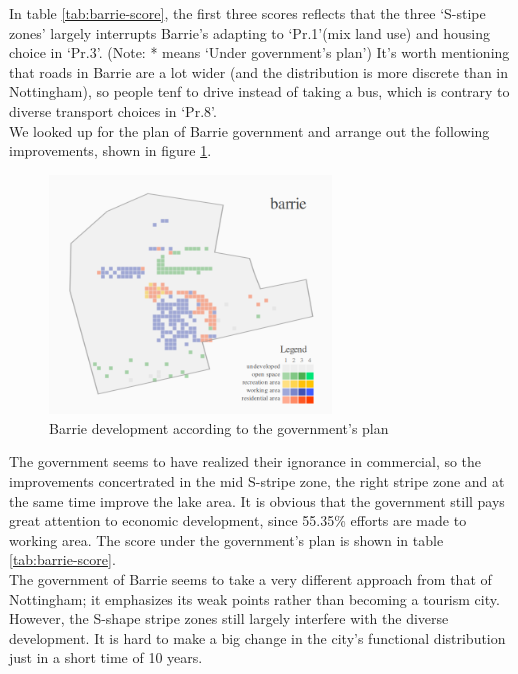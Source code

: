 In table \ref{tab:barrie-score}, the first three scores reflects that the three `S-stipe zones' largely interrupts Barrie's adapting to `Pr.1'(mix land use) and housing choice in `Pr.3'. (Note: * means `Under government's plan')
It's worth mentioning that roads in Barrie are a lot wider (and the distribution is more discrete than in Nottingham), so people tenf to drive instead of taking a bus, which is contrary to diverse transport choices in `Pr.8'.\\

We looked up for the plan of Barrie government \cite{pdf:barrie-downtown-plan} \cite{pdf:barrie-waterfront} \cite{pdf:barrie-official-plan} \cite{pdf:barrie-industrial-mapping} and arrange out the following improvements, shown in figure \ref{fig:barrie-patch-diff}.\\
\begin{figure}[htb]
  \label{fig:barrie-patch-diff}
  \centering
  \includegraphics[width=7.5cm]{pic/barrie-patch-diff-development.png}
  \caption{Barrie development according to the government's plan}
\end{figure}

The government seems to have realized their ignorance in commercial, so the improvements concertrated in the mid S-stripe zone, the right stripe zone and at the same time improve the lake area.
It is obvious that the government still pays great attention to economic development, since 55.35\% efforts are made to working area.
The score under the government's plan is shown in table \ref{tab:barrie-score}.\\

The government of Barrie seems to take a very different approach from that of Nottingham; it emphasizes its weak points rather than becoming a tourism city.
However, the S-shape stripe zones still largely interfere with the diverse development.
It is hard to make a big change in the city's functional distribution just in a short time of 10 years.

